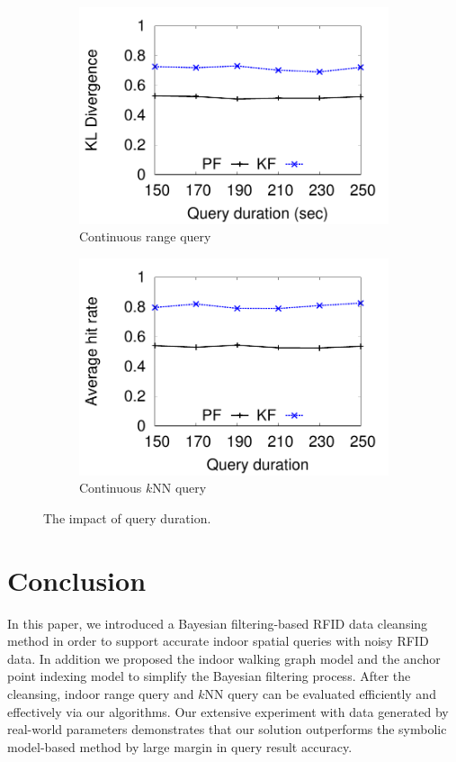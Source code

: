 \documentclass[12pt]{report}
\begin{document}
\begin{figure}[h]
  \centering
  \begin{subfigure}{.5\linewidth}
    \centering
    \includegraphics[width=\textwidth]{img/cont-kl-t.pdf}
    \caption{Continuous range query}
  \end{subfigure}%
  \begin{subfigure}{.5\linewidth}
    \centering
    \includegraphics[width=\textwidth]{img/cont-hit-t.pdf}
    \caption{Continuous \(k\)NN query}
  \end{subfigure}
  \caption{The impact of query duration.}
  \label{fig:cont-duration}
\end{figure}

\part{Conclusion}
\label{sec:conclusion}
In this paper, we introduced a Bayesian filtering-based RFID data
cleansing method in order to support accurate indoor spatial queries
with noisy RFID data.  In addition we proposed the indoor walking
graph model and the anchor point indexing model to simplify the
Bayesian filtering process.  After the cleansing, indoor range query
and \(k\)NN query can be evaluated efficiently and effectively via
our algorithms.  Our extensive experiment with data generated by
real-world parameters demonstrates that our solution outperforms the
symbolic model-based method by large margin in query result
accuracy.
\end{document}
